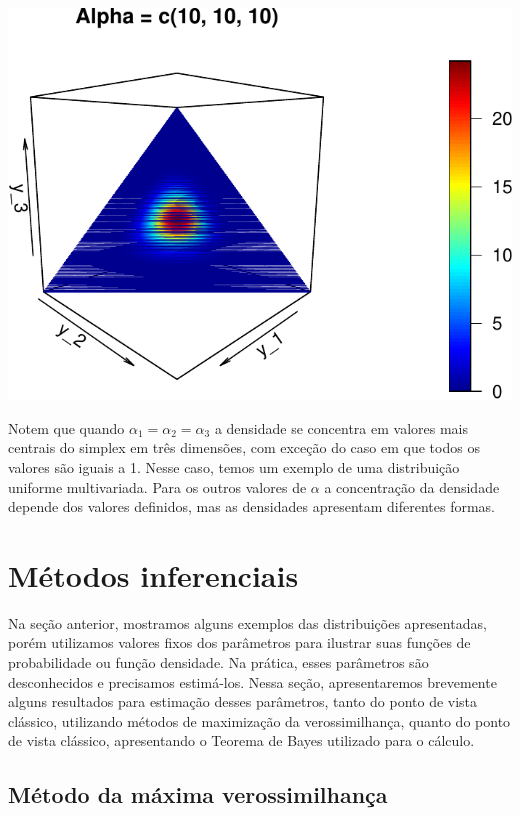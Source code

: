 \documentclass[]{book}
\begin{document}
\begin{center}\includegraphics[width=0.8\linewidth]{notas_livro_files/figure-latex/graf15-5} \end{center}

Notem que quando \(\alpha_1 = \alpha_2 = \alpha_3\) a densidade se concentra em valores mais centrais do simplex em três dimensões, com exceção do caso em que todos os valores são iguais a 1. Nesse caso, temos um exemplo de uma distribuição uniforme multivariada. Para os outros valores de \(\alpha\) a concentração da densidade depende dos valores definidos, mas as densidades apresentam diferentes formas.

\hypertarget{metodos-inferenciais}{%
\section{Métodos inferenciais}\label{metodos-inferenciais}}

Na seção anterior, mostramos alguns exemplos das distribuições apresentadas, porém utilizamos valores fixos dos parâmetros para ilustrar suas funções de probabilidade ou função densidade. Na prática, esses parâmetros são desconhecidos e precisamos estimá-los. Nessa seção, apresentaremos brevemente alguns resultados para estimação desses parâmetros, tanto do ponto de vista clássico, utilizando métodos de maximização da verossimilhança, quanto do ponto de vista clássico, apresentando o Teorema de Bayes utilizado para o cálculo.

\hypertarget{metodo-da-maxima-verossimilhanca}{%
\subsection{Método da máxima verossimilhança}\label{metodo-da-maxima-verossimilhanca}}
\end{document}
